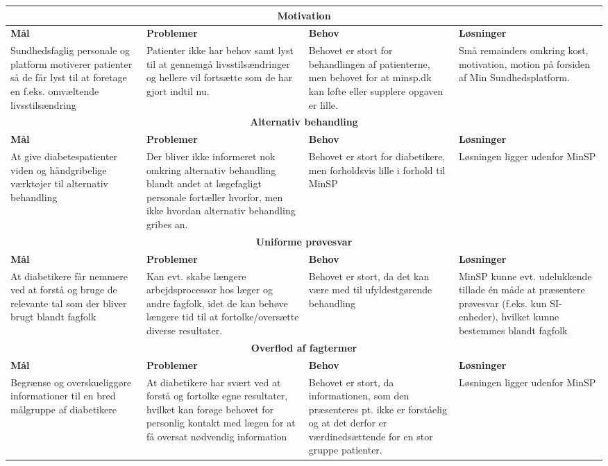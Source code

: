 \newpage

\begin{tabularx}{\textwidth}{|X|X|X|X|}
	\hline
	\multicolumn{4}{|c|}{\textbf{Motivation}}\\
	\hline
	\textbf{Mål} & \textbf{Problemer} & \textbf{Behov} & \textbf{Løsninger}\\
	\hline
	Sundhedsfaglig personale og platform motiverer patienter så de får lyst til at foretage en f.eks. omvæltende livsstilsændring&
	Patienter ikke har behov samt lyst til at gennemgå livsstilsændringer og hellere vil fortsætte som de har gjort indtil nu.&
	Behovet er stort for behandlingen af patienterne, men behovet for at minsp.dk kan løfte eller supplere opgaven er lille.&
	Små remainders omkring kost, motivation, motion på forsiden af Min Sundhedsplatform.\\
	\hline
	\multicolumn{4}{|c|}{\textbf{Alternativ behandling}}\\
	\hline
	\textbf{Mål} & \textbf{Problemer} & \textbf{Behov} & \textbf{Løsninger}\\
	\hline
	At give diabetespatienter viden og håndgribelige værktøjer til alternativ behandling&
	Der bliver ikke informeret nok omkring alternativ behandling blandt andet at lægefagligt personale fortæller hvorfor, men ikke hvordan alternativ behandling gribes an.&
	Behovet er stort for diabetikere, men forholdsvis lille i forhold til MinSP&
	Løsningen ligger udenfor MinSP\\
	\hline
	\multicolumn{4}{|c|}{\textbf{Uniforme prøvesvar}}\\
	\hline
	\textbf{Mål} & \textbf{Problemer} & \textbf{Behov} & \textbf{Løsninger}\\
	\hline
	At diabetikere får nemmere ved at forstå og bruge de relevante tal som der bliver brugt blandt fagfolk&
	Kan evt. skabe længere arbejdsprocessor hos læger og andre fagfolk, idet de kan behøve længere tid til at fortolke/oversætte diverse resultater.&
	Behovet er stort, da det kan være med til ufyldestgørende behandling&
	MinSP kunne evt. udelukkende tillade én måde at præsentere prøvesvar (f.eks. kun SI-enheder), hvilket kunne bestemmes blandt fagfolk\\
	\hline
	\multicolumn{4}{|c|}{\textbf{Overflod af fagtermer}}\\
	\hline
	\textbf{Mål} & \textbf{Problemer} & \textbf{Behov} & \textbf{Løsninger}\\
	\hline
	Begrænse og overskueliggøre informationer til en bred målgruppe af diabetikere&
	At diabetikere har svært ved at forstå og fortolke egne resultater, hvilket kan forøge behovet for personlig kontakt med lægen for at få oversat nødvendig information&
	Behovet er stort, da informationen, som den præsenteres pt. ikke er forståelig og at det derfor er værdinedsættende for en stor gruppe patienter.&
	Løsningen ligger udenfor MinSP\\
	\hline
\end{tabularx}

